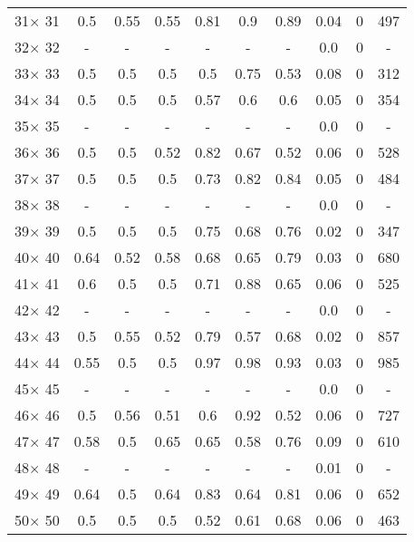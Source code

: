 \documentclass[main.tex]{subfiles}
\begin{document}
\begin{table}
\begin{tabular}{|c||c|c|c|c|c|c||c|c|c|}
31$\times$ 31 &0.5 &0.55 &0.55 &0.81 &0.9 &0.89 &0.04 &0 &497\\
32$\times$ 32 & - & - & - & - & - & - &0.0 &0 &-\\
33$\times$ 33 &0.5 &0.5 &0.5 &0.5 &0.75 &0.53 &0.08 &0 &312\\
34$\times$ 34 &0.5 &0.5 &0.5 &0.57 &0.6 &0.6 &0.05 &0 &354\\
35$\times$ 35 & - & - & - & - & - & - &0.0 &0 &-\\
36$\times$ 36 &0.5 &0.5 &0.52 &0.82 &0.67 &0.52 &0.06 &0 &528\\
37$\times$ 37 &0.5 &0.5 &0.5 &0.73 &0.82 &0.84 &0.05 &0 &484\\
38$\times$ 38 & - & - & - & - & - & - &0.0 &0 &-\\
39$\times$ 39 &0.5 &0.5 &0.5 &0.75 &0.68 &0.76 &0.02 &0 &347\\
40$\times$ 40 &0.64 &0.52 &0.58 &0.68 &0.65 &0.79 &0.03 &0 &680\\
41$\times$ 41 &0.6 &0.5 &0.5 &0.71 &0.88 &0.65 &0.06 &0 &525\\
42$\times$ 42 & - & - & - & - & - & - &0.0 &0 &-\\
43$\times$ 43 &0.5 &0.55 &0.52 &0.79 &0.57 &0.68 &0.02 &0 &857\\
44$\times$ 44 &0.55 &0.5 &0.5 &0.97 &0.98 &0.93 &0.03 &0 &985\\
45$\times$ 45 & - & - & - & - & - & - &0.0 &0 &-\\
46$\times$ 46 &0.5 &0.56 &0.51 &0.6 &0.92 &0.52 &0.06 &0 &727\\
47$\times$ 47 &0.58 &0.5 &0.65 &0.65 &0.58 &0.76 &0.09 &0 &610\\
48$\times$ 48 & - & - & - & - & - & - &0.01 &0 &-\\
49$\times$ 49 &0.64 &0.5 &0.64 &0.83 &0.64 &0.81 &0.06 &0 &652\\
50$\times$ 50 &0.5 &0.5 &0.5 &0.52 &0.61 &0.68 &0.06 &0 &463\\
\hline
\end{tabular}
\end{table}
\end{document}
